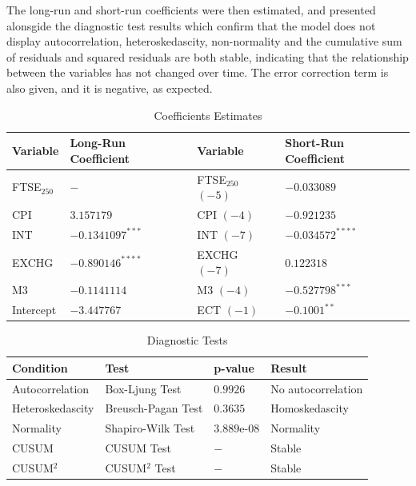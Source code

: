 \documentclass[11pt,a4paper]{article}
\begin{document}
The long-run and short-run coefficients were then estimated, and presented 
alonsgide the diagnostic test results which confirm that the model does not
display autocorrelation, heteroskedascity, non-normality and the cumulative 
sum of residuals and squared residuals are both stable, indicating that the 
relationship between the variables has not changed over time. The error
correction term is also given, and it is negative, as expected.

\begin{table}[h!]
    \centering
    \caption{Coefficients Estimates}
    \begin{tabular}{llll}
        \toprule
        \textbf{Variable} & \textbf{Long-Run Coefficient} & \textbf{Variable} & \textbf{Short-Run Coefficient} \\
        \midrule
        FTSE$_{250}$ & $-$ & FTSE$_{250}$ $(-5)$  & $-0.033089$ \\
        CPI & $3.157179$ & CPI $(-4)$ & $-0.921235$ \\
        INT & $-0.1341097^{***}$ & INT $(-7)$ & $-0.034572^{****}$\\
        EXCHG &  $-0.890146^{****}$ & EXCHG $(-7)$ & $0.122318$ \\
        M3 & $-0.1141114$ & M3 $(-4)$ & $-0.527798^{***}$ \\
        Intercept & $-3.447767$ & ECT $(-1)$ & $-0.1001^{**}$ \\
        \bottomrule
    \end{tabular}
\end{table}

\begin{table}[h!]
    \centering
    \caption{Diagnostic Tests}
    \begin{tabular}{llll}
        \toprule
        \textbf{Condition} & \textbf{Test} & \textbf{p-value} & \textbf{Result} \\
        \midrule
        Autocorrelation & Box-Ljung Test & $0.9926$ & No autocorrelation \\
        Heteroskedascity & Breusch-Pagan Test & $0.3635$ & Homoskedascity \\
        Normality & Shapiro-Wilk Test & $3.889$e-$08$ & Normality \\
        CUSUM & CUSUM Test & $-$ & Stable \\
        CUSUM$^2$ & CUSUM$^2$ Test & $-$ & Stable \\
        \bottomrule
    \end{tabular}
\end{table}
\end{document}
